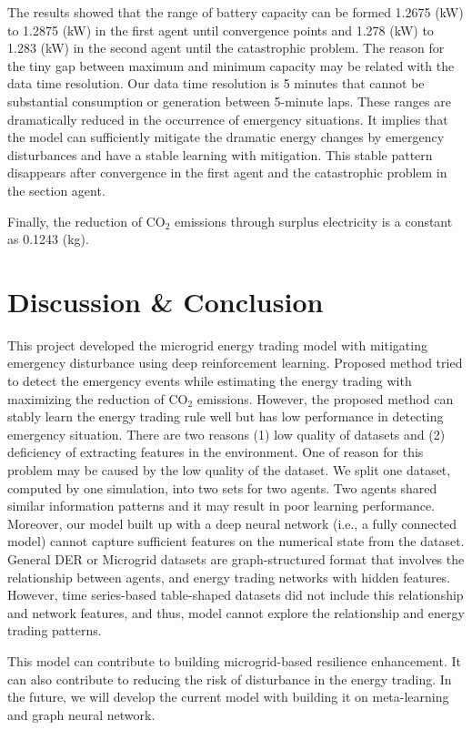 \documentclass[conference]{IEEEtran}
\begin{document}
The results showed that the range of battery capacity can be formed 1.2675 (kW) to 1.2875 (kW) in the first agent until convergence points and 1.278 (kW) to 1.283 (kW) in the second agent until the catastrophic problem. The reason for the tiny gap between maximum and minimum capacity may be related with the data time resolution. Our data time resolution is 5 minutes that cannot be substantial consumption or generation between 5-minute laps. These ranges are dramatically reduced in the occurrence of emergency situations. It implies that the model can sufficiently mitigate the dramatic energy changes by emergency disturbances and have a stable learning with mitigation. This stable pattern disappears after convergence in the first agent and the catastrophic problem in the section agent. 

Finally, the reduction of CO$_2$ emissions through surplus electricity is a constant as 0.1243 (kg).

\section{Discussion \& Conclusion}
This project developed the microgrid energy trading model with mitigating emergency disturbance using deep reinforcement learning. Proposed method tried to detect the emergency events while estimating the energy trading with maximizing the reduction of CO$_2$ emissions. However, the proposed method can stably learn the energy trading rule well but has low performance in detecting emergency situation. There are two reasons (1) low quality of datasets and (2) deficiency of extracting features in the environment. One of reason for this problem may be caused by the low quality of the dataset. We split one dataset, computed by one simulation, into two sets for two agents. Two agents shared similar information patterns and it may result in poor learning performance. Moreover, our model built up with a deep neural network (i.e., a fully connected model) cannot capture sufficient features on the numerical state from the dataset. General DER or Microgrid datasets are graph-structured format that involves the relationship between agents, and energy trading networks with hidden features. However, time series-based table-shaped datasets did not include this relationship and network features, and thus, model cannot explore the relationship and energy trading patterns.

This model can contribute to building microgrid-based resilience enhancement. It can also contribute to reducing the risk of disturbance in the energy trading. In the future, we will develop the current model with building it on meta-learning and graph neural network. 
\end{document}
